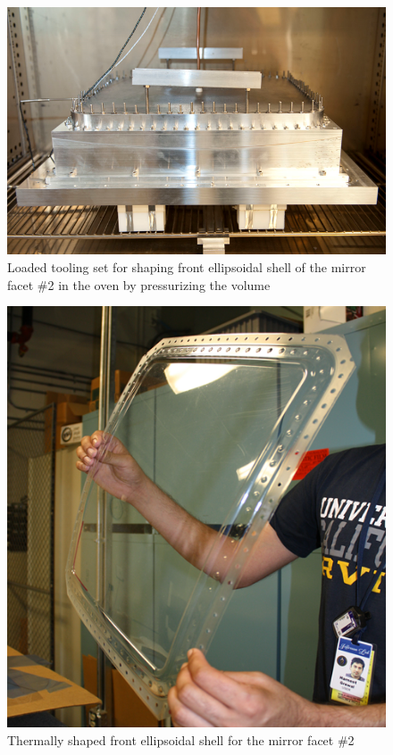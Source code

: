 \begin{figure}[h]
    \centering
    \includegraphics[width=0.95\linewidth]{Pres_Shaping_Front.png}
    \caption{Loaded tooling set for shaping front ellipsoidal shell of the mirror facet \#2 in the oven by pressurizing the volume}
    \label{fig:Pres_Shaping_Front}
\end{figure}{}
\begin{figure}[h]
    \centering
    \includegraphics[width=0.90\linewidth]{Front_Shell.png}
    \caption{Thermally shaped front ellipsoidal shell for the mirror facet \#2}
    \label{fig:Shell}
\end{figure}{}

